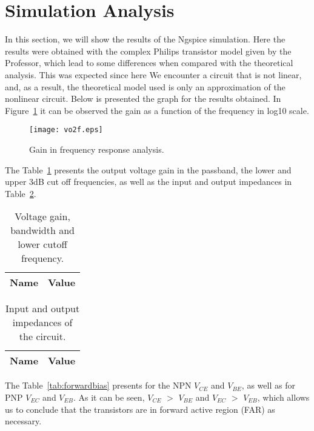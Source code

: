 \section{Simulation Analysis}
\label{sec:simulation}
In this section, we will show the results of the Ngspice
simulation. Here the results were obtained with the complex
Philips transistor model given by the Professor, which lead
to some differences when compared with the theoretical
analysis. This was expected since here We encounter a
circuit that is not linear, and, as a result, the
theoretical model used is only an approximation of the nonlinear circuit.
Below is presented the graph for the results obtained. In
Figure~\ref{fig:sim1} it can be observed the gain as a
function of the frequency in log10 scale.

\begin{figure}[H] \centering
\texttt{[image: vo2f.eps]}
\caption{Gain in frequency response analysis.}
\label{fig:sim1}
\end{figure}

The Table~\ref{tab:spice} presents the output voltage
gain in the passband, the lower and upper 3dB cut off
frequencies, as well as the input and output impedances in Table~\ref{tab:imped}.

\begin{table}[H]
 \centering
 \begin{tabular}{|l|r|}
 \hline
 {\bf Name} & {\bf Value} \\ \hline

 \end{tabular}
 \caption{Voltage gain, bandwidth and lower cutoff frequency.}
 \label{tab:spice}
 \end{table}
 
 \begin{table}[H]
 \centering
 \begin{tabular}{|l|r|}
 \hline
 {\bf Name} & {\bf Value} \\ \hline


 \end{tabular}
 \caption{Input and output impedances of the circuit.}
 \label{tab:imped}
 \end{table}

The Table~\ref{tab:forwardbias} presents for the NPN $V_{CE}$ and $V_{BE}$, as well as for
PNP $V_{EC}$ and $V_{EB}$. As it can be seen, $V_{CE}$ $>$ $V_{BE}$ and $V_{EC}$ $>$ $V_{EB}$, which allows us to
conclude that the transistors are in forward active region (FAR) as necessary.

